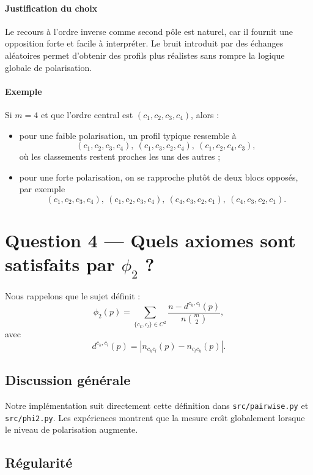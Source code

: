 \documentclass[11pt,a4paper]{article}
\begin{document}
\paragraph{Justification du choix}
Le recours \`a l'ordre inverse comme second p\^ole est naturel, car il fournit une opposition forte et facile \`a interpr\'eter. Le bruit introduit par des \'echanges al\'eatoires permet d'obtenir des profils plus r\'ealistes sans rompre la logique globale de polarisation.

\paragraph{Exemple}
Si \(m=4\) et que l'ordre central est \((c_1,c_2,c_3,c_4)\), alors :
\begin{itemize}[leftmargin=*]
    \item pour une faible polarisation, un profil typique ressemble \`a
    \[
    (c_1,c_2,c_3,c_4),\ (c_1,c_3,c_2,c_4),\ (c_1,c_2,c_4,c_3),
    \]
    o\`u les classements restent proches les uns des autres ;
    \item pour une forte polarisation, on se rapproche plut\^ot de deux blocs oppos\'es, par exemple
    \[
    (c_1,c_2,c_3,c_4),\ (c_1,c_2,c_3,c_4),\ (c_4,c_3,c_2,c_1),\ (c_4,c_3,c_2,c_1).
    \]
\end{itemize}

\section{Question 4 --- Quels axiomes sont satisfaits par \texorpdfstring{$\phi_2$}{phi2} ?}

Nous rappelons que le sujet d\'efinit :
\[
\phi_2(p)=\sum_{\{c_k,c_l\}\in C^2}\frac{n-d^{c_k,c_l}(p)}{n\binom{m}{2}},
\]
avec
\[
d^{c_k,c_l}(p)=|n_{c_kc_l}(p)-n_{c_lc_k}(p)|.
\]

\subsection*{Discussion g\'en\'erale}

Notre impl\'ementation suit directement cette d\'efinition dans \texttt{src/pairwise.py} et \texttt{src/phi2.py}. Les exp\'eriences montrent que la mesure cro\^\i t globalement lorsque le niveau de polarisation augmente.

\subsection*{R\'egularit\'e}
\end{document}
